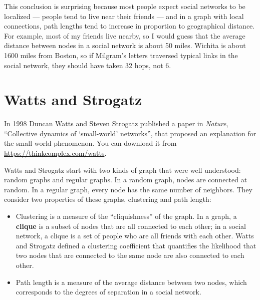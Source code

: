 \documentclass[12pt]{book}
\theoremstyle{exercise}
\begin{document}

This conclusion is surprising because most people expect social
networks to be localized --- people tend to live near their
friends --- and in a graph with local connections, path lengths tend to
increase in proportion to geographical distance.  For example, most of
my friends live nearby, so I would guess that the average distance
between nodes in a social network is about 50 miles.  Wichita is about
1600 miles from Boston, so if Milgram's letters traversed typical
links in the social network, they should have taken 32 hops, not 6.



\section{Watts and Strogatz}
\label{watts}

In 1998 Duncan Watts and Steven Strogatz published a paper in {\em
  Nature}, ``Collective dynamics of `small-world' networks'', that
proposed an explanation for the small world phenomenon.  You can
download it from
\url{https://thinkcomplex.com/watts}.


Watts and Strogatz start with two kinds of graph that were well
understood: random graphs and regular graphs.  In a random graph, nodes
are connected at random.  In a regular graph, every node has the
same number of neighbors.
They consider two
properties of these graphs, clustering and path length:


\begin{itemize}

\item Clustering is a measure of the ``cliquishness'' of the graph.
In a graph, a {\bf clique} is a subset of nodes that are
all connected to each other; in a social network, a clique is
a set of people who are all friends with each other.  Watts and Strogatz
defined a clustering coefficient that quantifies the likelihood
that two nodes that are connected to the same node are also
connected to each other.


\item Path length is a measure of the average distance between
two nodes, which corresponds to the degrees of separation in
a social network.

\end{itemize}
\end{document}
